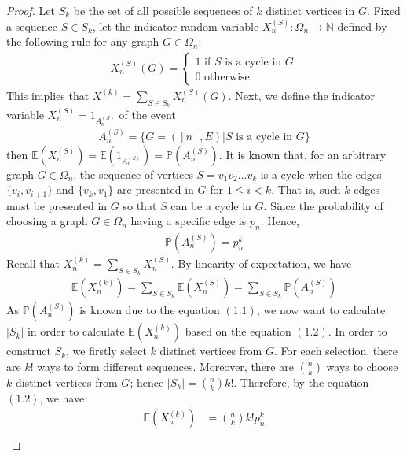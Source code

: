 \begin{proof}
  Let $S_{k}$ be the set of all possible sequences of $k$ distinct vertices in $G$. Fixed a sequence $S \in S_{k}$, let the indicator random variable $X_{n}^{(S)} : \Omega_{n} \to \mathbb{N}$ defined by the following rule for any graph $G \in \Omega_{n}$:
  \begin{align*}
    X_{n}^{(S)}(G) = 
    \begin{cases}
      1 \text{ if $S$ is a cycle in $G$} \\
      0 \text{ otherwise}
    \end{cases}
  \end{align*}
  This implies that $X^{(k)} = \sum\limits_{S \in S_{k}} X_{n}^{(S)}(G)$. Next, we define the indicator variable $X_{n}^{(S)} = 1_{A_{n}^{(S)}}$ of the event
  \begin{align*}
    A_{n}^{(S)} = \{G = ([n], E) | S \text{ is a cycle in $G$}\} 
  \end{align*}
  then $\mathbb{E}(X_{n}^{(S)}) = \mathbb{E}(1_{A_{n}^{(S)}}) = \mathbb{P}(A_{n}^{(S)})$. It is known that, for an arbitrary graph $G \in \Omega_{n}$, the sequence of vertices $S = v_{1}v_{2} \ldots v_{k}$ is a cycle when the edges $\{v_{i}, v_{i + 1}\}$ and $\{v_{k}, v_{1}\}$ are presented in $G$ for $1 \leq i < k$. That is, such $k$ edges must be presented in $G$ so that $S$ can be a cycle in $G$. Since the probability of choosing a graph $G \in \Omega_{n}$ having a specific edge is $p_{n}$. Hence,
  \begin{align*}
    \mathbb{P}(A_{n}^{(S)}) = p_{n}^{k} \tag{1.1}
  \end{align*}
  Recall that $X_{n}^{(k)} = \sum\limits_{S \in S_{k}} X_{n}^{(S)}$. By linearity of expectation, we have
  \begin{align*}
    \mathbb{E}(X_{n}^{(k)}) = \sum_{S \in S_{k}} \mathbb{E}(X_{n}^{(S)}) = \sum_{S \in S_{k}} \mathbb{P}(A_{n}^{(S)}) \tag{1.2} 
  \end{align*}
  As $\mathbb{P}(A_{n}^{(S)})$ is known due to the equation $(1.1)$, we now want to calculate $|S_{k}|$ in order to calculate $\mathbb{E}(X_{n}^{(k)})$ based on the equation $(1.2)$. In order to construct $S_{k}$, we firstly select $k$ distinct vertices from $G$. For each selection, there are $k!$ ways to form different sequences. Moreover, there are $\binom{n}{k}$ ways to choose $k$ distinct vertices from $G$; hence $|S_{k}| = \binom{n}{k}k!$. Therefore, by the equation $(1.2)$, we have
  \begin{align*}
    \mathbb{E}(X_{n}^{(k)}) &= \binom{n}{k} k! p_{n}^{k} \\

\end{align*}
\end{proof}
